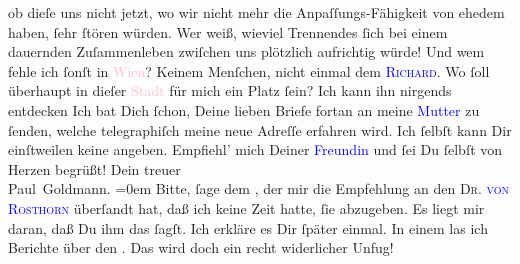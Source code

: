                ob dieſe uns nicht jetzt, wo wir nicht mehr die
               Anpaſſungs-Fähigkeit von ehedem haben, ſehr ſtören  würden. Wer weiß,  wieviel
               Trennendes ſich bei einem dauernden Zuſammenleben zwiſchen uns plötzlich aufrichtig
               würde! Und wem fehle ich ſonſt in \textcolor{pink}{Wien}{}\ledrightnote{\textcolor{pink}{Wien}}? Keinem
               Menſchen, nicht einmal dem \textsc{\textcolor{blue}{Richard}{}\ledrightnote{\textcolor{blue}{Richard Beer-Hofmann}}}. Wo ſoll überhaupt in dieſer \textcolor{pink}{Stadt}{} für mich ein Platz ſein? Ich kann ihn nirgends entdecken{\dotsfive}\pend
           \pstart
           Ich  bat Dich ſchon, Deine {\pb}lieben Briefe fortan an meine \textcolor{blue}{Mutter}{} zu ſenden, welche telegraphiſch
               meine neue Adreſſe erfahren wird. Ich ſelbſt kann Dir einſtweilen keine angeben.\pend
           \pstart
           Empfiehl’ mich Deiner \textcolor{blue}{Freundin}{} und ſei Du ſelbſt von Herzen begrüßt!\pend
           \pstart
           Dein treuer {\\[\baselineskip]}\spacefill\mbox{Paul Goldmann.}\pend
           \leftskip=0em{}\pstart
           \noindent{}Bitte, ſage dem \label{K_L02861-67v}\label{K_L02861-67h}, der mir die Empfehlung an den \textsc{Dr. 
                     \textcolor{blue}{von Rosthorn}{}\ledrightnote{\textcolor{blue}{Arthur Rosthorn}}} überſandt hat, daß ich keine Zeit hatte, ſie abzugeben. Es liegt mir daran,
                  daß Du ihm das ſagſt. Ich erkläre es Dir ſpäter einmal.\pend
           \pstart
           In einem \label{K_L02861-56v}\label{K_L02861-56h} las ich Berichte
                  über den \label{K_L02861-11v}\label{K_L02861-11h}. Das wird doch ein recht
                  widerlicher Unfug!\pend
           \endnumbering{}\begin{anhang}\end{anhang}
      